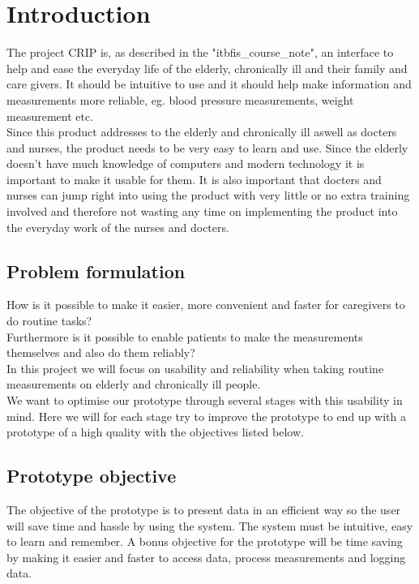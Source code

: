 \chapter{Introduction}
The project CRIP is, as described in the "itbfis\_course\_note", an interface to help and ease the everyday life of the elderly, chronically ill and their family and care givers. It should be intuitive to use and it should help make information and measurements more reliable, eg. blood pressure measurements, weight measurement  etc. \\
Since this product addresses to the elderly and chronically ill aswell as docters and nurses, the product needs to be very easy to learn and use. Since the elderly doesn't have much knowledge of computers and modern technology it is important to make it usable for them. It is also important that docters and nurses can jump right into using the product with very little or no extra training involved and therefore not wasting any time on implementing the product into the everyday work of the nurses and docters.\\

\section{Problem formulation}
How is it possible to make it easier, more convenient and faster for caregivers to do routine tasks?\\
Furthermore is it possible to enable patients to make the measurements themselves and also do them reliably?\\
In this project we will focus on usability and reliability when taking routine measurements on elderly and chronically ill people.\\
We want to optimise our prototype through several stages with this usability in mind. Here we will for each stage try to improve the prototype to end up with a prototype of a high quality with the objectives listed below.\\


\section{Prototype objective}
The objective of the prototype is to present data in an efficient way so the user will save time and hassle by using the system. The system must be intuitive, easy to learn and remember. A bonus objective for the prototype will be time saving by making it easier and faster to access data, process measurements and logging data. 

